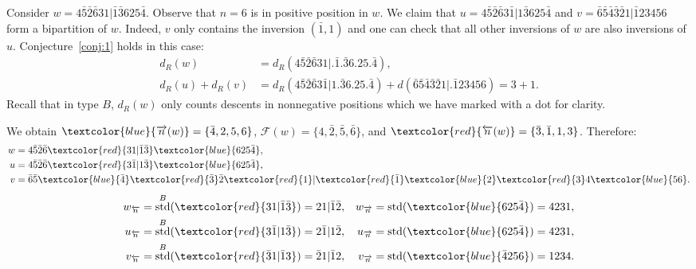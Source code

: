 \documentclass[Unicode]{cedram-alco}
\theoremstyle{definition}
\DeclareMathOperator{\std}{std}
\newcommand{\R}{{\overrightarrow{n}}}
\newcommand{\LL}{{\overleftarrow{n}}}
\newcommand{\dd}{d_R}
\newcommand{\Bstd}{\std^{B}}
\newcommand{\F}{\mathcal{F}}
\newcommand{\red}[1]{\textcolor{red}{#1}}
\newcommand{\blue}[1]{\textcolor{blue}{#1}}
\begin{document}
\begin{ex}
\label{ex:typeB-pos1}
Consider $w = 4 \bar{5} \bar{2} \bar{6} 3 1 | \bar{1} \bar{3} 6 2 5 \bar{4}$. Observe that $n=6$ is in positive position in $w$. We claim that $u = 4 \bar{5} \bar{2} \bar{6} 3 \bar{1} | 1 \bar{3} 6 2 5 \bar{4}$ and $v = \bar{6} \bar{5} \bar{4} \bar{3} \bar{2} 1 | \bar{1} 2 3 4 5 6$ form a bipartition of $w$. Indeed, $v$ only contains the inversion $(\bar{1}, 1)$ and one can check that all other inversions of $w$ are also inversions of $u$. Conjecture~\ref{conj:1} holds in this case: 
\begin{align*}
\dd(w) &= \dd(4 \bar{5} \bar{2} \bar{6} 3 1 |. \bar{1}. \bar{3} 6. 2 5. \bar{4}), \\
\dd(u) + \dd(v) &= \dd(4 \bar{5} \bar{2} \bar{6} 3 \bar{1} | 1 . \bar{3} 6 . 2 5 . \bar{4}) + d(\bar{6} \bar{5} \bar{4} \bar{3} \bar{2} 1 |. \bar{1} 2 3 4 5 6) = 3 + 1.
\end{align*}
Recall that in type $B$, $\dd(w)$ only counts descents in nonnegative positions which we have marked with a dot for clarity.



We obtain $\blue{\R(w)} = \lbrace \bar{4}, 2, 5, 6 \rbrace$, $\F(w) = \lbrace 4, \bar{2}, \bar{5}, \bar{6} \rbrace$, and $\red{\LL(w)} = \lbrace \bar{3}, \bar{1}, 1, 3 \rbrace$. Therefore:
\begin{align*}
w &=   4 \bar{5} \bar{2} \bar{6} \red{ 3 1 | \bar{1} \bar{3}} \blue{ 6 2 5 \bar{4}} ,\\
u &= 4 \bar{5} \bar{2} \bar{6} \red{ 3 \bar{1} | 1 \bar{3}} \blue{ 6 2 5 \bar{4}}, \\
v &= \bar{6} \bar{5} \blue{\bar{4}} \red{\bar{3}} \bar{2} \red{1} | \red{\bar{1}} \blue{2} \red{3} 4 \blue{5 6}.
\end{align*}
\begin{align*}
w_\LL &= \Bstd(\red{31 | \bar{1} \bar{3}}) = 2 1 | \bar{1} \bar{2}, & w_\R &= \std(\blue{6 2 5 \bar{4}}) = 4 2 3 1 ,\\
u_\LL &= \Bstd(\red{3 \bar{1} | 1 \bar{3}}) = 2 \bar{1} | 1 \bar{2}, & u_\R &= \std(\blue{6 2 5 \bar{4}}) = 4 2 3 1, \\
v_\LL &= \Bstd(\red{\bar{3} 1 | \bar{1} 3}) = \bar{2} 1 | \bar{1} 2, & v_\R &= \std(\blue{\bar{4} 2 5 6}) = 1 2 3 4. 
\end{align*}
\end{ex}
\end{document}
